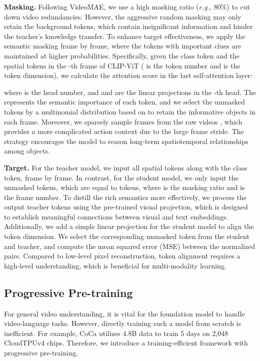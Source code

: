 \documentclass[10pt,twocolumn,letterpaper]{article}
\begin{document}
\textbf{Masking.}
Following VideoMAE,
we use a high masking ratio (\textit{e.g.}, 80\%) to cut down video redundancies.
However,
the aggressive random masking may only retain the background tokens,
which contain insignificant information and hinder the teacher's knowledge transfer.
To enhance target effectiveness,
we apply the semantic masking \cite{milan} frame by frame,
where the tokens with important clues are maintained at higher probabilities.
Specifically,
given the class token  and the spatial tokens  in the -th frame of CLIP-ViT ( is the token number and  is the token dimension),
we calculate the attention score in the last self-attention \cite{vit} layer:

where  is the head number,
and  and  are the linear projections in the -th head.
The  represents the semantic importance of each token,
and we select the unmasked tokens by a multinomial distribution based on  to retain the informative objects in each frame.
Moreover,
we sparsely sample frames from the raw videos \cite{tsn},
which provides a more complicated action context due to the large frame stride.
The strategy encourages the model to reason long-term spatiotemporal relationships among objects.

\textbf{Target.}
For the teacher model, 
we input all  spatial tokens along with the class token, 
frame by frame. 
In contrast, 
for the student model, 
we only input the unmasked tokens, 
which are equal to  tokens, 
where  is the masking ratio and  is the frame number. 
To distill the rich semantics more effectively, 
we process the output teacher tokens using the pre-trained visual projection,
which is designed to establish meaningful connections between visual and text embeddings.
Additionally, 
we add a simple linear projection for the student model to align the token dimension. 
We select the corresponding unmasked token from the student and teacher, 
and compute the mean squared error (MSE) between the normalized pairs.
Compared to low-level pixel reconstruction,
token alignment requires a high-level understanding,
which is beneficial for multi-modality learning.


\subsection{Progressive Pre-training}
For general video understanding,
it is vital for the foundation model to handle video-language tasks.
However,
directly training such a model from scratch is inefficient.
For example,
CoCa \cite{coca} utilizes 4.8B data to train 5 days on 2,048 CloudTPUv4 chips.
Therefore,
we introduce a training-efficient framework with progressive pre-training.
\end{document}
